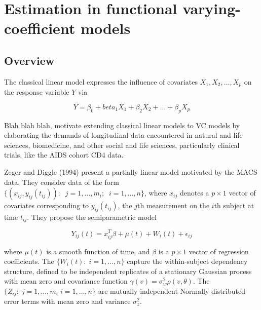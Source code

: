 \documentclass[12pt]{article}
\begin{document}

\section{Estimation in functional varying-coefficient models}
\subsection{Overview}

The classical linear model expresses the influence of covariates $X_1, X_2, \dots, X_p$ on the response variable $Y$ via 

\begin{equation}
Y = \beta_0 + beta_1 X_1 + \beta_2 X_2 + \dots + \beta_p X_p \label{classical_linear_model}
\end{equation}

Blah blah blah, motivate extending classical linear models to VC models by elaborating the demands of longitudinal data encountered in natural and life sciences, biomedicine, and other social and life sciences, particularly clinical trials, like the AIDS cohort CD4 data. 

Zeger and Diggle (1994) present a partially linear model motivated by the MACS data. They consider data of the form $\lbrace \left(x_{ij},y_{ij}\left(t_{ij}\right)\right): \;\; j=1,\dots,m_i;\;\;i=1,\dots,n \rbrace$, where $x_{ij}$ denotes a $p \times 1$ vector of covariates corresponding to $y_{ij}\left(t_{ij}\right)$, the $j$th measurement on the $i$th subject at time $t_{ij}$.  They propose the semiparametric model 

\begin{equation}
Y_{ij}\left(t\right) =  x_{ij}^T\beta + \mu\left(t\right) + W_i\left(t\right) + \epsilon_{ij} \label{zeger_diggle_VC_model}
\end{equation}

where $\mu\left(t\right)$ is a smooth function of time, and $\beta$ is a $p \times 1$ vector of regression coefficients. The $\lbrace W_i\left(t\right):\;i=1,\dots,n \rbrace$ capture the within-subject dependency structure, defined to be independent replicates of a stationary Gaussian process with mean zero and covariance function $\gamma\left(v\right) = \sigma_w^2\rho\left(v, \theta \right)$. The $\lbrace Z_{ij}:\;j=1,\dots,m_i\;i=1,\dots,n \rbrace$ are mutually independent Normally distributed error terms with mean zero and variance $\sigma_z^2$.
\end{document}
